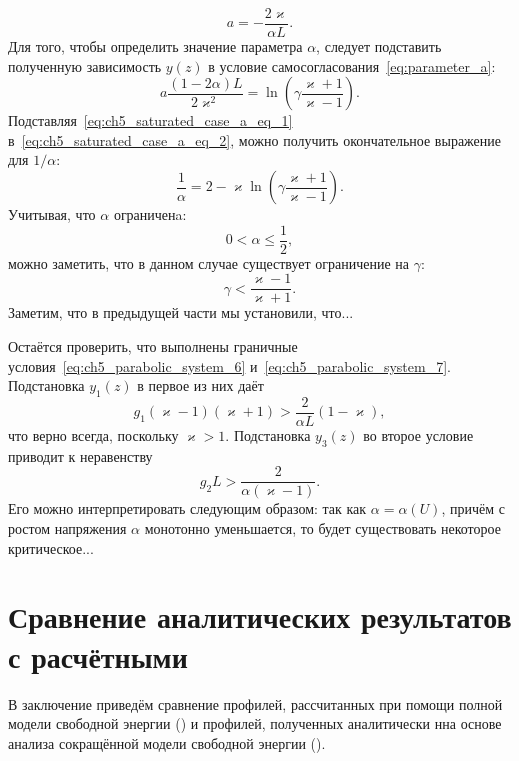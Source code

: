 \begin{equation}\label{eq:ch5_saturated_case_a_eq_1}
	a = -\frac{2\varkappa}{\alpha L}.
\end{equation}
Для того, чтобы определить значение параметра $\alpha$, следует подставить полученную зависимость $y(z)$ в условие самосогласования~\eqref{eq:parameter_a}:
\begin{equation}\label{eq:ch5_saturated_case_a_eq_2}
	a\frac{(1 - 2\alpha)L}{2\varkappa^2} = \ln\left( \gamma \frac{\varkappa + 1}{\varkappa - 1} \right).
\end{equation}
Подставляя~\eqref{eq:ch5_saturated_case_a_eq_1} в~\eqref{eq:ch5_saturated_case_a_eq_2}, можно получить окончательное выражение для $1/\alpha$:
\begin{equation}
	\frac{1}{\alpha} = 2 - \varkappa\ln\left( \gamma\frac{\varkappa + 1}{\varkappa - 1} \right).
\end{equation}
Учитывая, что $\alpha$ ограниченa:
\begin{equation}
	0 < \alpha \leq \frac{1}{2},
\end{equation}
можно заметить, что в данном случае существует ограничение на $\gamma$:
\begin{equation}
	\gamma < \frac{\varkappa - 1}{\varkappa + 1}.
\end{equation}
Заметим, что в предыдущей части мы установили, что...

Остаётся проверить, что выполнены граничные условия~\eqref{eq:ch5_parabolic_system_6} и~\eqref{eq:ch5_parabolic_system_7}.
Подстановка $y_1(z)$ в первое из них даёт
\begin{equation}
	g_1(\varkappa - 1)(\varkappa + 1) > \frac{2}{\alpha L}(1 - \varkappa),
\end{equation}
что верно всегда, поскольку $\varkappa > 1$.
Подстановка $y_3(z)$ во второе условие приводит к неравенству
\begin{equation}
	g_2 L > \frac{2}{\alpha(\varkappa - 1)}.
\end{equation}
Его можно интерпретировать следующим образом: так как $\alpha = \alpha(U)$, причём с ростом напряжения $\alpha$ монотонно уменьшается, то будет существовать некоторое критическое...



\section{Сравнение аналитических результатов с расчётными}
В заключение приведём сравнение профилей, рассчитанных при помощи полной модели свободной энергии () и профилей, полученных аналитически нна основе анализа сокращённой модели свободной энергии ().


